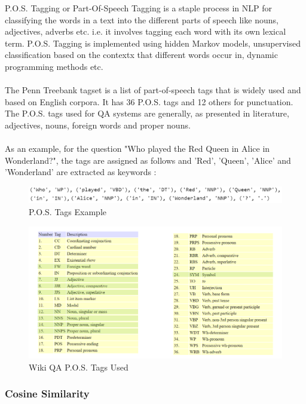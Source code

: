 \documentclass[12pt, a4paper]{article}
\begin{document}
P.O.S. Tagging or Part-Of-Speech Tagging is a staple process in NLP for classifying the words in a text into the different parts of speech like nouns, adjectives, adverbs etc. i.e. it involves tagging each word with its own lexical term. P.O.S. Tagging is implemented using hidden Markov models, unsupervised classification based on the contextx that different words occur in, dynamic programming methods etc. 
\\~\\ 
The Penn Treebank tagset is a list of part-of-speech tags that is widely used and based on English corpora. It has 36 P.O.S. tags and 12 others for punctuation. \cite{pos} The P.O.S. tags used for QA systems are generally, as presented in literature, adjectives, nouns, foreign words and proper nouns. 
\\~\\
As an example, for the question "Who played the Red Queen in Alice in Wonderland?", the tags are assigned as follows and 'Red', 'Queen', 'Alice' and 'Wonderland' are extracted as keywords : 

\begin{figure}[h]
    \includegraphics[scale=0.5]{pos tags eg.png} 
    \centering 
    \caption{P.O.S. Tags Example}
    \centering 
\end{figure} 

\begin{figure}[h]
    \includegraphics[scale=0.6]{pos stand.png} 
    \centering 
    \caption{Wiki QA P.O.S. Tags Used}
    \centering 
\end{figure} 

\subsubsection{Cosine Similarity} 
\end{document}
